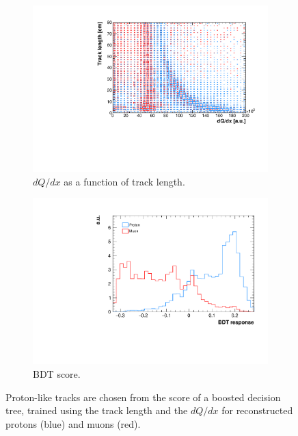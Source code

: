 \begin{figure}[htbp]
\centering
  \begin{subfigure}{0.45\textwidth}
    \includegraphics[width=\linewidth]{figures/dqdx.pdf}
    \caption{$dQ/dx$ as a function of track length.} 
  \end{subfigure}
    \begin{subfigure}{0.45\textwidth}
    \includegraphics[width=\linewidth]{figures/bdt.pdf}
    \caption{BDT score.} 
  \end{subfigure}
  \caption{Proton-like tracks are chosen from the score of a boosted decision tree, trained using the track length and the $dQ/dx$ for reconstructed protons (blue) and muons (red).}\label{fig:bdt}
\end{figure}

